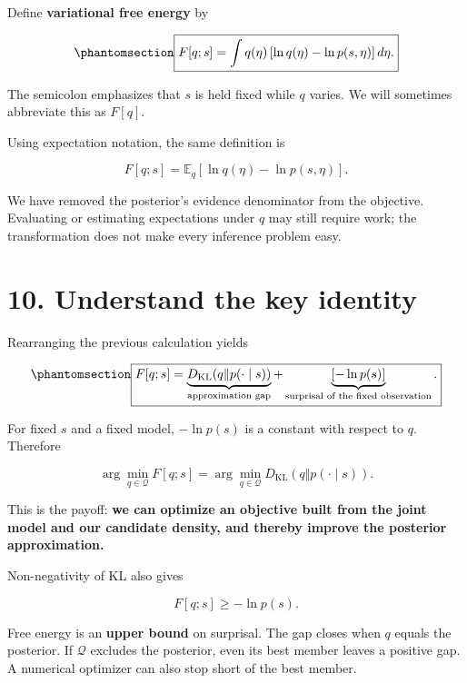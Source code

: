 \documentclass[
  letterpaper,
  DIV=11,
  numbers=noendperiod]{scrreprt}
\begin{document}
Define \textbf{variational free energy} by

\begin{equation}\protect\phantomsection\label{eq-vfe-definition}{
\boxed{
F[q;s]=\int q(\eta)\left[\ln q(\eta)-\ln p(s,\eta)\right]d\eta.
}
}\end{equation}

The semicolon emphasizes that \(s\) is held fixed while \(q\) varies. We
will sometimes abbreviate this as \(F[q]\).

Using expectation notation, the same definition is

\[
F[q;s]=\mathbb E_q\!\left[\ln q(\eta)-\ln p(s,\eta)\right].
\]

We have removed the posterior's evidence denominator from the objective.
Evaluating or estimating expectations under \(q\) may still require
work; the transformation does not make every inference problem easy.

\section{10. Understand the key
identity}\label{understand-the-key-identity}

Rearranging the previous calculation yields

\begin{equation}\protect\phantomsection\label{eq-vfe-identity}{
\boxed{
F[q;s]
=\underbrace{D_{\mathrm{KL}}\!\left(q\Vert p(\cdot\mid s)\right)}_{\text{approximation gap}}
+\underbrace{[-\ln p(s)]}_{\text{surprisal of the fixed observation}}.
}
}\end{equation}

For fixed \(s\) and a fixed model, \(-\ln p(s)\) is a constant with
respect to \(q\). Therefore

\[
\arg\min_{q\in\mathcal Q}F[q;s]
=\arg\min_{q\in\mathcal Q}D_{\mathrm{KL}}\!\left(q\Vert p(\cdot\mid s)\right).
\]

This is the payoff: \textbf{we can optimize an objective built from the
joint model and our candidate density, and thereby improve the posterior
approximation.}

Non-negativity of KL also gives

\[
F[q;s]\geq-\ln p(s).
\]

Free energy is an \textbf{upper bound} on surprisal. The gap closes when
\(q\) equals the posterior. If \(\mathcal Q\) excludes the posterior,
even its best member leaves a positive gap. A numerical optimizer can
also stop short of the best member.
\end{document}
